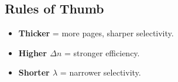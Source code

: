 \documentclass[10pt,article]{article}
\begin{document}
\subsection*{Rules of Thumb}
\begin{itemize}
    \setlength{\itemsep}{0pt}
    \setlength{\parskip}{0pt}
    \item \textbf{Thicker} = more pages, sharper selectivity.
    \item \textbf{Higher $\Delta n$} = stronger efficiency.
    \item \textbf{Shorter $\lambda$} = narrower selectivity.
\end{itemize}
\end{document}
